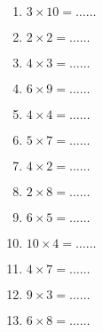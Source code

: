 \documentclass[11pt]{article}
\begin{document}
\begin{exercice}[1]
\begin{multicols}{5}
\begin{enumerate}[label=\arabic*)]
\item  $ 3\times 10 =\ldots\ldots$ 
\item  $ 2\times 2 =\ldots\ldots$ 
\item  $ 4\times 3 =\ldots\ldots$ 
\item  $ 6\times 9 =\ldots\ldots$ 
\item  $ 4\times 4 =\ldots\ldots$ 
\item  $ 5\times 7 =\ldots\ldots$ 
\item  $ 4\times 2 =\ldots\ldots$ 
\item  $ 2\times 8 =\ldots\ldots$ 
\item  $ 6\times 5 =\ldots\ldots$ 
\item  $ 10\times 4 =\ldots\ldots$ 
\item  $ 4\times 7 =\ldots\ldots$ 
\item  $ 9\times 3 =\ldots\ldots$ 
\item  $ 6\times 8 =\ldots\ldots$ 
\end{enumerate}
\end{multicols}
\end{exercice}
\end{document}
